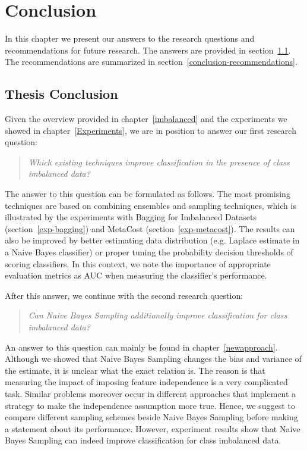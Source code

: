 \chapter{Conclusion}\label{Conclusion}
In this chapter we present our answers to the research questions and recommendations for future research. The answers are provided in section~\ref{conclusion-answer}. The recommendations are summarized in section~\ref{conclusion-recommendations}.

\section{Thesis Conclusion}\label{conclusion-answer}

Given the overview provided in chapter~\ref{imbalanced} and the experiments we showed in chapter~\ref{Experiments}, we are in position to answer our first research question:

\begin{quote}\emph{Which existing techniques improve classification in the presence of class imbalanced data?}\end{quote}

The answer to this question can be formulated as follows. The most promising techniques are based on combining ensembles and sampling techniques, which is illustrated by the experiments with Bagging for Imbalanced Datasets (section~\ref{exp-bagging}) and MetaCost (section~\ref{exp-metacost}). The results can also be improved by better estimating data distribution (e.g. Laplace estimate in a Naive Bayes classifier) or proper tuning the probability decision thresholds of scoring classifiers. In this context, we note the importance of appropriate evaluation metrics as AUC when measuring the classifier's performance.

After this answer, we continue with the second research question:

\begin{quote}\emph{Can Naive Bayes Sampling additionally improve classification for class imbalanced data?}\end{quote}

An answer to this question can mainly be found in chapter~\ref{newapproach}. Although we showed that Naive Bayes Sampling changes the bias and variance of the estimate, it is unclear what the exact relation is. The reason is that measuring the impact of imposing feature independence is a very complicated task. Similar problems moreover occur  in different approaches that implement a strategy to make the independence assumption more true. Hence, we suggest to compare different sampling schemes beside Naive Bayes Sampling before making a statement about its performance. However, experiment results show that Naive Bayes Sampling can indeed improve classification for class imbalanced data.


